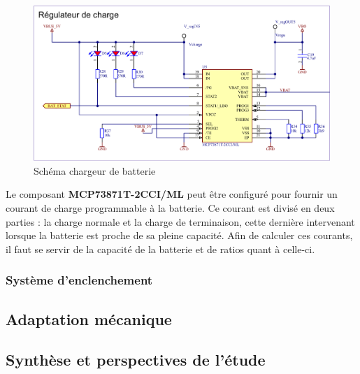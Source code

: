 \begin{figure}[h]
	\centering
	\includegraphics[width=.85\linewidth]{../figures/etude/sch/CHRG-BAT}
	\caption{Schéma chargeur de batterie}
	\label{fig:chrg-bat}
\end{figure}

Le composant \textbf{MCP73871T-2CCI/ML} peut être configuré pour fournir un courant de charge programmable à la batterie. Ce courant est divisé en deux parties : la charge normale et la charge de terminaison, cette dernière intervenant lorsque la batterie est proche de sa pleine capacité.
Afin de calculer ces courants, il faut se servir de la capacité de la batterie et de ratios quant à celle-ci.



\subsubsection{Système d'enclenchement} \label{sssec:On-OFF}

\subsection{Adaptation mécanique} \label{sssec:Adaptation-mech}

\subsection{Synthèse et perspectives de l'étude} \label{ssec:Synth-etude}